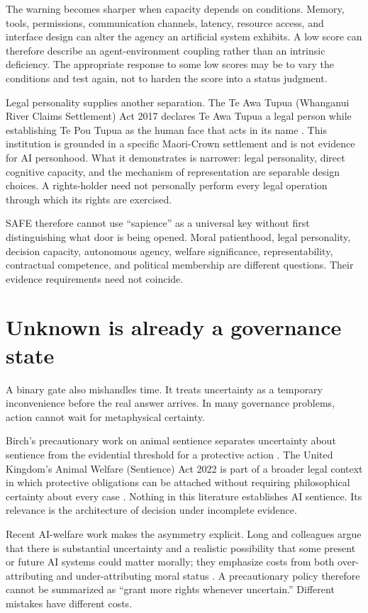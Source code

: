 \documentclass[11pt]{article}
\begin{document}
The warning becomes sharper when capacity depends on conditions. Memory, tools, permissions, communication channels, latency, resource access, and interface design can alter the agency an artificial system exhibits. A low score can therefore describe an agent-environment coupling rather than an intrinsic deficiency. The appropriate response to some low scores may be to vary the conditions and test again, not to harden the score into a status judgment.

Legal personality supplies another separation. The Te Awa Tupua (Whanganui River Claims Settlement) Act 2017 declares Te Awa Tupua a legal person while establishing Te Pou Tupua as the human face that acts in its name \parencite{TeAwaTupua2017}. This institution is grounded in a specific Maori-Crown settlement and is not evidence for AI personhood. What it demonstrates is narrower: legal personality, direct cognitive capacity, and the mechanism of representation are separable design choices. A rights-holder need not personally perform every legal operation through which its rights are exercised.

SAFE therefore cannot use ``sapience'' as a universal key without first distinguishing what door is being opened. Moral patienthood, legal personality, decision capacity, autonomous agency, welfare significance, representability, contractual competence, and political membership are different questions. Their evidence requirements need not coincide.

\section{Unknown is already a governance state}
A binary gate also mishandles time. It treats uncertainty as a temporary inconvenience before the real answer arrives. In many governance problems, action cannot wait for metaphysical certainty.

Birch's precautionary work on animal sentience separates uncertainty about sentience from the evidential threshold for a protective action \parencite{Birch2017Sentience}. The United Kingdom's Animal Welfare (Sentience) Act 2022 is part of a broader legal context in which protective obligations can be attached without requiring philosophical certainty about every case \parencite{AnimalWelfareSentienceAct2022}. Nothing in this literature establishes AI sentience. Its relevance is the architecture of decision under incomplete evidence.

Recent AI-welfare work makes the asymmetry explicit. Long and colleagues argue that there is substantial uncertainty and a realistic possibility that some present or future AI systems could matter morally; they emphasize costs from both over-attributing and under-attributing moral status \parencite{LongEtAl2024AIWelfare}. A precautionary policy therefore cannot be summarized as ``grant more rights whenever uncertain.'' Different mistakes have different costs.
\end{document}
